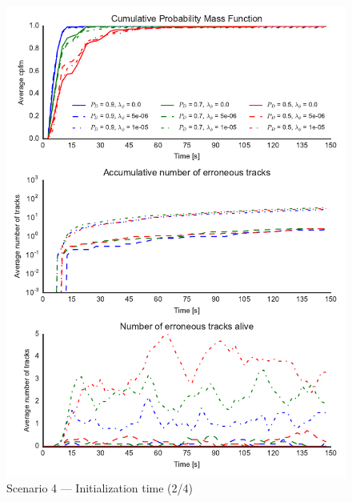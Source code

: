 \begin{figure}
\centering
\includegraphics{Figures/plots/Scenario4_Init-Time(2-4).pdf}
\caption{Scenario 4 --- Initialization time (2/4)}\label{fig:init4_time_2-4}
\end{figure}

